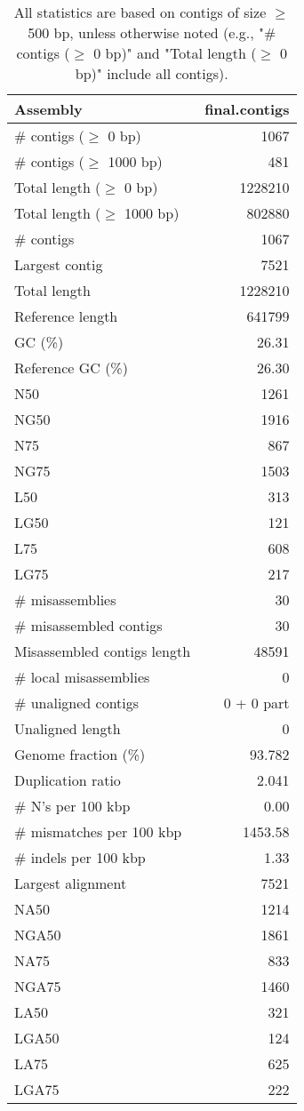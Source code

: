 \documentclass[12pt,a4paper]{article}
\begin{document}
\begin{table}[ht]
\begin{center}
\caption{All statistics are based on contigs of size $\geq$ 500 bp, unless otherwise noted (e.g., "\# contigs ($\geq$ 0 bp)" and "Total length ($\geq$ 0 bp)" include all contigs).}
\begin{tabular}{|l*{1}{|r}|}
\hline
Assembly & final.contigs \\ \hline
\# contigs ($\geq$ 0 bp) & 1067 \\ \hline
\# contigs ($\geq$ 1000 bp) & 481 \\ \hline
Total length ($\geq$ 0 bp) & 1228210 \\ \hline
Total length ($\geq$ 1000 bp) & 802880 \\ \hline
\# contigs & 1067 \\ \hline
Largest contig & 7521 \\ \hline
Total length & 1228210 \\ \hline
Reference length & 641799 \\ \hline
GC (\%) & 26.31 \\ \hline
Reference GC (\%) & 26.30 \\ \hline
N50 & 1261 \\ \hline
NG50 & 1916 \\ \hline
N75 & 867 \\ \hline
NG75 & 1503 \\ \hline
L50 & 313 \\ \hline
LG50 & 121 \\ \hline
L75 & 608 \\ \hline
LG75 & 217 \\ \hline
\# misassemblies & 30 \\ \hline
\# misassembled contigs & 30 \\ \hline
Misassembled contigs length & 48591 \\ \hline
\# local misassemblies & 0 \\ \hline
\# unaligned contigs & 0 + 0 part \\ \hline
Unaligned length & 0 \\ \hline
Genome fraction (\%) & 93.782 \\ \hline
Duplication ratio & 2.041 \\ \hline
\# N's per 100 kbp & 0.00 \\ \hline
\# mismatches per 100 kbp & 1453.58 \\ \hline
\# indels per 100 kbp & 1.33 \\ \hline
Largest alignment & 7521 \\ \hline
NA50 & 1214 \\ \hline
NGA50 & 1861 \\ \hline
NA75 & 833 \\ \hline
NGA75 & 1460 \\ \hline
LA50 & 321 \\ \hline
LGA50 & 124 \\ \hline
LA75 & 625 \\ \hline
LGA75 & 222 \\ \hline
\end{tabular}
\end{center}
\end{table}
\end{document}
